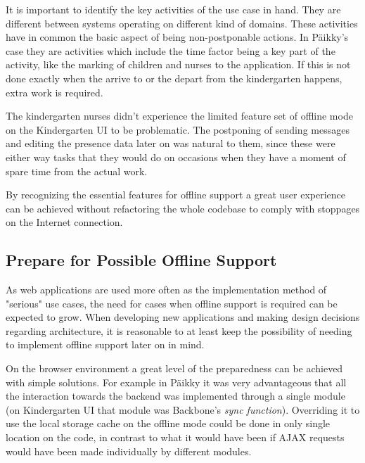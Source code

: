 It is important to identify the key activities of the use case in hand. They are different between systems operating on different kind of domains. These activities have in common the basic aspect of being non-postponable actions. In Päikky's case they are activities which include the time factor being a key part of the activity, like the marking of children and nurses to the application. If this is not done exactly when the arrive to or the depart from the kindergarten happens, extra work is required. 

The kindergarten nurses didn't experience the limited feature set of offline mode on the Kindergarten UI to be problematic. The postponing of sending messages and editing the presence data later on was natural to them, since these were either way tasks that they would do on occasions when they have a moment of spare time from the actual work.

By recognizing the essential features for offline support a great user experience can be achieved without refactoring the whole codebase to comply with stoppages on the Internet connection. 





\subsection{Prepare for Possible Offline Support}



As web applications are used more often as the implementation method of "serious" use cases, the need for cases when offline support is required can be expected to grow.  When developing new applications and making design decisions regarding architecture, it is reasonable to at least keep the possibility of needing to implement offline support later on in mind. 

On the browser environment a great level of the preparedness can be achieved with simple solutions. For example in Päikky it was very advantageous that all the interaction towards the backend was implemented through a single module (on Kindergarten UI that module was Backbone's \textit{sync function}). Overriding it to use the local storage cache on the offline mode could be done in only single location on the code, in contrast to what it would have been if AJAX requests would have been made individually by different modules. 

